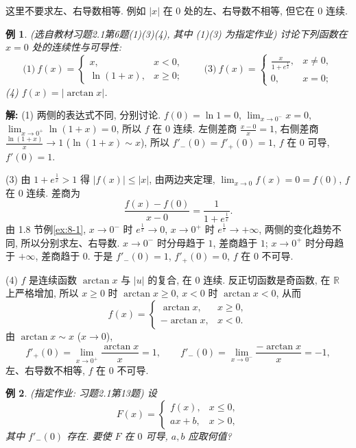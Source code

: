 \documentclass[UTF8,openany]{ctexbook}
\theoremstyle{chinesetextbook}
\newtheorem{example}{例}[section]
\newenvironment{cnsolution}{\par\indent\textbf{解:} \ignorespaces}{\par}
\begin{document}
这里不要求左、右导数相等. 例如 $|x|$ 在 $0$ 处的左、右导数不相等, 但它在 $0$ 连续.
\begin{example}\label{ex:c2-h1-6}
\textnormal{(选自教材习题2.1第6题(1)(3)(4), 其中 (1)(3) 为指定作业)} 讨论下列函数在 $x=0$ 处的连续性与可导性:
\[
\text{(1)}\ f(x)=\begin{cases}x,&x<0,\\\ln(1+x),&x\ge0;\end{cases}\qquad\text{(3)}\ f(x)=\begin{cases}\frac x{1+e^{\frac1x}},&x\ne0,\\0,&x=0;\end{cases}
\]
(4) $f(x)=|\arctan x|$.
\end{example}
\begin{cnsolution}
(1) 两侧的表达式不同, 分别讨论. $f(0)=\ln1=0$, $\displaystyle\lim_{x\to0^-}x=0$, $\displaystyle\lim_{x\to0^+}\ln(1+x)=0$, 所以 $f$ 在 $0$ 连续. 左侧差商 $\displaystyle\frac{x-0}x=1$, 右侧差商 $\displaystyle\frac{\ln(1+x)}x\to1$ ($\ln(1+x)\sim x$), 所以 $f'_-(0)=f'_+(0)=1$, $f$ 在 $0$ 可导, $f'(0)=1$.

(3) 由 $1+e^{\frac1x}>1$ 得 $|f(x)|\le|x|$, 由两边夹定理, $\displaystyle\lim_{x\to0}f(x)=0=f(0)$, $f$ 在 $0$ 连续. 差商为
\[
\frac{f(x)-f(0)}{x-0}=\frac1{1+e^{\frac1x}}.
\]
由 1.8 节例\ref{ex:8-1}, $x\to0^-$ 时 $e^{\frac1x}\to0$, $x\to0^+$ 时 $e^{\frac1x}\to+\infty$, 两侧的变化趋势不同, 所以分别求左、右导数. $x\to0^-$ 时分母趋于 $1$, 差商趋于 $1$; $x\to0^+$ 时分母趋于 $+\infty$, 差商趋于 $0$. 于是 $f'_-(0)=1$, $f'_+(0)=0$, $f$ 在 $0$ 不可导.

(4) $f$ 是连续函数 $\arctan x$ 与 $|u|$ 的复合, 在 $0$ 连续. 反正切函数是奇函数, 在 $\mathbb R$ 上严格增加, 所以 $x\ge0$ 时 $\arctan x\ge0$, $x<0$ 时 $\arctan x<0$, 从而
\[
f(x)=\begin{cases}\arctan x,&x\ge0,\\-\arctan x,&x<0.\end{cases}
\]
由 $\arctan x\sim x$ ($x\to0$),
\[
f'_+(0)=\lim_{x\to0^+}\frac{\arctan x}x=1,\qquad f'_-(0)=\lim_{x\to0^-}\frac{-\arctan x}x=-1,
\]
左、右导数不相等, $f$ 在 $0$ 不可导.
\end{cnsolution}
\begin{example}\label{ex:c2-h1-13}
\textnormal{(指定作业: 习题2.1第13题)} 设
\[
F(x)=\begin{cases}f(x),&x\le0,\\ax+b,&x>0,\end{cases}
\]
其中 $f'_-(0)$ 存在. 要使 $F$ 在 $0$ 可导, $a,b$ 应取何值?
\end{example}
\end{document}
